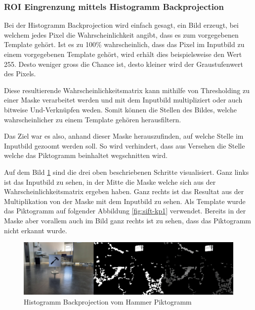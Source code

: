 \subsubsection{ROI Eingrenzung mittels Histogramm Backprojection}
Bei der Histogramm Backprojection wird einfach gesagt, ein Bild erzeugt, bei welchem jedes Pixel die Wahrscheinlichkeit angibt, dass es zum vorgegebenen Template gehört. Ist es zu 100\% wahrscheinlich, dass das Pixel im Inputbild zu einem vorgegebenen Template gehört, wird erhält dies beispielsweise den Wert 255. Desto weniger gross die Chance ist, desto kleiner wird der Graustufenwert des Pixels.

Diese resultierende Wahrscheinlichkeitsmatrix kann  mithilfe von Thresholding zu einer Maske verarbeitet werden und mit dem Inputbild multipliziert oder auch bitweise Und-Verknüpfen weden. Somit können die Stellen des Bildes, welche wahrscheinlicher zu einem Template gehören herausfiltern.

Das Ziel war es also, anhand dieser Maske herauszufinden, auf welche Stelle im Inputbild gezoomt werden soll. So wird verhindert, dass aus Versehen die Stelle welche das Piktogramm beinhaltet wegschnitten wird.

Auf dem Bild \ref{fig:backprojection-hammer} sind die drei oben beschriebenen Schritte visualisiert. Ganz links ist das Inputbild zu sehen, in der Mitte die Maske welche sich aus der Wahrscheinlichkeitsmatrix ergeben haben. Ganz rechts ist das Resultat aus der Multiplikation von der Maske mit dem Inputbild zu sehen. Als Template wurde das Piktogramm auf folgender Abbildung \ref{fig:sift-kp1} verwendet. Bereits in der Maske aber vorallem auch im Bild ganz rechts ist zu sehen, dass das Piktogramm nicht erkannt wurde. 

\begin{figure}[H]
  \includegraphics[width=1\textwidth]{img/piktogrammerkennung/hammer_backprojection.jpg}
  \centering
  \caption{Histogramm Backprojection vom Hammer Piktogramm}
  \label{fig:backprojection-hammer}
\end{figure}

